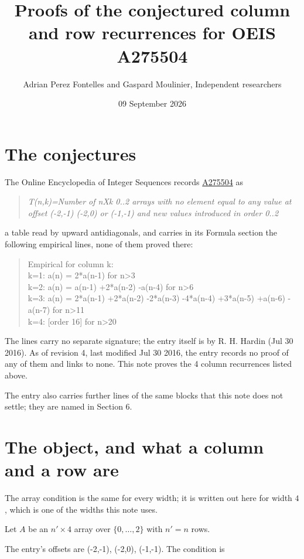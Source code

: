 \documentclass[11pt]{article}
\title{Proofs of the conjectured column and row recurrences for OEIS A275504}
\author{Adrian Perez Fontelles and Gaspard Moulinier, Independent researchers}
\date{09 September 2026}
\theoremstyle{definition}
\begin{document}
\maketitle
\section{The conjectures}

The Online Encyclopedia of Integer Sequences records \href{https://oeis.org/A275504}{A275504} as

\begin{quote}\itshape T(n,k)=Number of nXk 0..2 arrays with no element equal to any value at offset (-2,-1) (-2,0) or (-1,-1) and new values introduced in order 0..2\end{quote}

a table read by upward antidiagonals, and carries in its Formula section the following empirical lines, none of them proved there:

\begin{quote}\ttfamily Empirical for column k:\\
k=1: a(n) = 2*a(n-1) for n>3\\k=2: a(n) = a(n-1) +2*a(n-2) -a(n-4) for n>6\\k=3: a(n) = 2*a(n-1) +2*a(n-2) -2*a(n-3) -4*a(n-4) +3*a(n-5) +a(n-6) -a(n-7) for n>11\\k=4: [order 16] for n>20\end{quote}

The lines carry no separate signature; the entry itself is by R. H. Hardin (Jul 30 2016). As of revision 4, last modified Jul 30 2016, the entry records no proof of any of them and links to none. This note proves the 4 column recurrences listed above.

The entry also carries further lines of the same blocks that this note does not settle; they are named in Section 6.

\section{The object, and what a column and a row are}

The array condition is the same for every width; it is written out here for width $4$, which is one of the widths this note uses.

Let $A$ be an $n' \times 4$ array over $\{0,\dots,2\}$ with $n' = n$ rows.

The entry's offsets are (-2,-1), (-2,0), (-1,-1). The condition is
\end{document}
